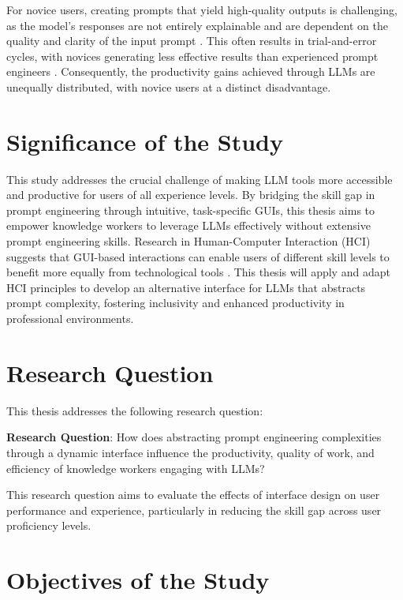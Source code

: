 For novice users, creating prompts that yield high-quality outputs is challenging, as the model's responses are not entirely explainable and are dependent on the quality and clarity of the input prompt \cite{cabrero-daniel_perceived_2023}. This often results in trial-and-error cycles, with novices generating less effective results than experienced prompt engineers \cite{kim_understanding_2024, mugunthan_overcoming_2023}. Consequently, the productivity gains achieved through LLMs are unequally distributed, with novice users at a distinct disadvantage.

\section{Significance of the Study}

This study addresses the crucial challenge of making LLM tools more accessible and productive for users of all experience levels. By bridging the skill gap in prompt engineering through intuitive, task-specific GUIs, this thesis aims to empower knowledge workers to leverage LLMs effectively without extensive prompt engineering skills. Research in Human-Computer Interaction (HCI) suggests that GUI-based interactions can enable users of different skill levels to benefit more equally from technological tools \cite{shneiderman_direct_1983}. This thesis will apply and adapt HCI principles to develop an alternative interface for LLMs that abstracts prompt complexity, fostering inclusivity and enhanced productivity in professional environments.

\section{Research Question}

This thesis addresses the following research question:

\textbf{Research Question}: How does abstracting prompt engineering complexities through a dynamic interface influence the productivity, quality of work, and efficiency of knowledge workers engaging with LLMs?

This research question aims to evaluate the effects of interface design on user performance and experience, particularly in reducing the skill gap across user proficiency levels.

\section{Objectives of the Study}

